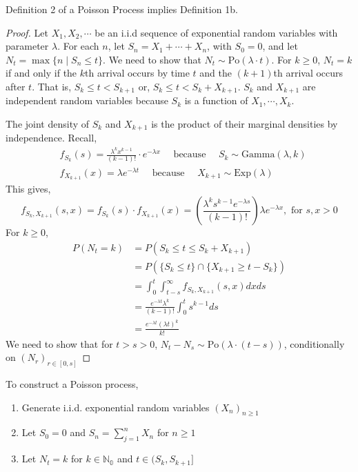 \begin{thm}
  Definition 2 of a Poisson Process implies Definition 1b.
\end{thm}

\begin{proof}
  Let $X_1, X_2, \cdots$ be an i.i.d sequence of exponential random variables with parameter $\lambda$. For each $n$, let $S_n = X_1 + \cdots + X_n$, with $S_0 = 0$, and let $N_t = \max \{n \mid S_n \leq t\}$. We need to show that $N_t \sim \text{Po}(\lambda \cdot t)$. For $k \geq 0$, $N_t = k$ if and only if the $k$th arrival occurs by time $t$ and the $(k+1)$th arrival occurs after $t$. That is, $S_k \leq t < S_{k+1}$ or, $S_k \leq t < S_k + X_{k+1}$. $S_k$ and $X_{k+1}$ are independent random variables because $S_k$ is a function of $X_1, \cdots, X_k$.

  The joint density of $S_k$ and $X_{k+1}$ is the product of their marginal densities by independence. Recall,
  \begin{align*}
    &f_{S_{k}}(s) = \frac{\lambda^{k} x^{k-1}}{(k-1) !} \cdot e^{-\lambda x}  \quad \text{ because } \quad S_{k} \sim \text{Gamma}(\lambda, k) \\
    &f_{X_{k+1}}(x) = \lambda e^{-\lambda t} \quad \text{ because } \quad X_{k+1} \sim \text{Exp}(\lambda)
  \end{align*}
  This gives,
  \[f_{S_{k}, X_{k+1}}(s, x)=f_{S_{k}}(s) \cdot f_{X_{k+1}}(x)=\left(\frac{\lambda^{k} s^{k-1} e^{-\lambda s}}{(k-1) !}\right) \lambda e^{-\lambda x}, \text { for } s, x>0\]
  \noindent For $k \geq 0$, 
  \begin{align*}
    P(N_t = k) &= P(S_k \leq t \leq S_k + X_{k+1}) \\
               &= P(\{S_k \leq t\} \cap \{X_{k+1} \geq t - S_k\}) \\
               &= \int_{0}^{t} \int_{t-s}^{\infty} f_{S_{k}, X_{k+1}}(s, x) d x d s \\
               &=\frac{e^{-\lambda t} \lambda^{k}}{(k-1) !} \int_{0}^{t} s^{k-1} d s \\
               &=\frac{e^{-\lambda t}(\lambda t)^{k}}{k !}
  \end{align*}
  We need to show that for $t > s > 0$, $N_t - N_s \sim \text{Po}(\lambda \cdot (t - s))$, conditionally on $(N_r)_{r \in [0,s]}$
\end{proof}

\begin{lem}
  To construct a Poisson process,
  \begin{enumerate}
      \item Generate i.i.d. exponential random variables $(X_n)_{n \geq 1}$
      \item Let $S_0 = 0$ and $S_{n}=\sum_{j=1}^n X_n$ for $n \geq 1$
      \item Let $N_{t}=k$ for $k \in \mathbb{N_0}$ and $t \in (S_k, S_{k+1}]$
  \end{enumerate}
\end{lem}